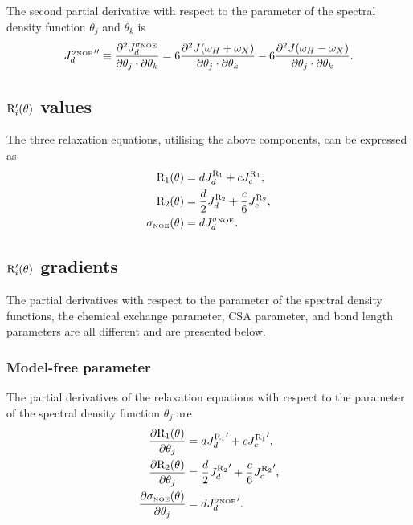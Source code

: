 \noindent The second partial derivative with respect to the parameter of the spectral density function $\theta_j$ and $\theta_k$ is
\begin{equation}
    {J_d^{\sigma_{\scriptscriptstyle \mathrm{NOE}}}}'' \equiv \frac{\partial^2 J_d^{\sigma_{\scriptscriptstyle \mathrm{NOE}}}}{\partial \theta_j \cdot \partial \theta_k}
        = 6 \frac{\partial^2 J(\omega_H + \omega_X)}{\partial \theta_j \cdot \partial \theta_k}
        - 6 \frac{\partial^2 J(\omega_H - \omega_X)}{\partial \theta_j \cdot \partial \theta_k}.  \label{eq: J terms: JsigmaNOEd"}
\end{equation}




\subsection{$\mathrm{R}_i'(\theta)$ values}

The three relaxation equations, utilising the above components, can be expressed as
\begin{align}
    \mathrm{R}_1(\theta) & = d J_d^{\mathrm{R}_1} + c J_c^{\mathrm{R}_1},                          \label{eq: Ri': R1} \\
    \mathrm{R}_2(\theta) & = \frac{d}{2} J_d^{\mathrm{R}_2} + \frac{c}{6} J_c^{\mathrm{R}_2},      \label{eq: Ri': R2} \\
    \sigma_{\scriptscriptstyle \mathrm{NOE}}(\theta) & = d J_d^{\sigma_{\scriptscriptstyle \mathrm{NOE}}}.                          \label{eq: Ri': sigmaNOE}
\end{align}




\subsection{$\mathrm{R}_i'(\theta)$ gradients}

The partial derivatives with respect to the parameter of the spectral density functions, the chemical exchange parameter, CSA parameter, and bond length parameters are all different and are presented below.


\subsubsection{Model-free parameter}

The partial derivatives of the relaxation equations with respect to the parameter of the spectral density function $\theta_j$ are
\begin{align}
    \frac{\partial \mathrm{R}_1(\theta)}{\partial \theta_j} &= d {J_d^{\mathrm{R}_1}}' + c {J_c^{\mathrm{R}_1}}',                      \label{eq: Ri': dR1/dmf} \\
    \frac{\partial \mathrm{R}_2(\theta)}{\partial \theta_j} &= \frac{d}{2} {J_d^{\mathrm{R}_2}}' + \frac{c}{6} {J_c^{\mathrm{R}_2}}',  \label{eq: Ri': dR2/dmf} \\
    \frac{\partial \sigma_{\scriptscriptstyle \mathrm{NOE}}(\theta)}{\partial \theta_j} &= d {J_d^{\sigma_{\scriptscriptstyle \mathrm{NOE}}}}'.                         \label{eq: Ri': dsigmaNOE/dmf}
\end{align}


